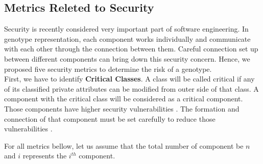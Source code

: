\documentclass[letterpaper, 10 pt, conference]{ieeeconf}  %
\begin{document}
\subsection{Metrics Releted to Security}
Security is recently considered very important part of  software engineering. In genotype representation, each component works individually and  communicate with each other through the connection between them. 
Careful connection set up between different components can bring down this security concern. Hence, we proposed five security metrics to determine the risk of a genotype. \\ 
First, we have to identify \textbf{Critical Classes}. A class will be called critical if any of its classified private attributes can be modified from outer side of that class\cite{alshammari2010security}. A component with the critical class will be considered as a critical component. Those components have higher security  vulnerabilities . The formation and connection of that component must be set carefully to reduce those  vulnerabilities .

For all metrics bellow, let us assume that the total number of component be $n$ and $i$ represents the $i^{th}$ component.
\end{document}
